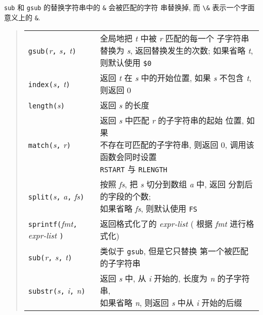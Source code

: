\texttt{sub} 和 \texttt{gsub} 的替换字符串中的 \verb'&' 会被匹配的字符
串替换掉, 而 \verb'\&' 表示一个字面意义上的 \verb'&'.
\begin{quote}
    \begin{tabular}{ll}
        \texttt{gsub(}\textit{r}\texttt{,} \textit{s}\texttt{,}
        \textit{t}\texttt{)} &
        \makecell[tl]{全局地把 \textit{t} 中被 \textit{r} 匹配的每一个
        子字符串替换为 \textit{s}, 返回替换发生的次数; \\ 如果省略 \textit{t},
        则默认使用 \texttt{\$0}} \\

        \texttt{index(}\textit{s}\texttt{,} \textit{t}\texttt{)} &
        返回 \textit{t} 在 \textit{s} 中的开始位置, 如果 \textit{s}
        不包含 \textit{t}, 则返回 0 \\

        \texttt{length(}\textit{s}\texttt{)} & 返回 \textit{s} 的长度 \\

        \texttt{match(}\textit{s}\texttt{,} \textit{r}\texttt{)} &
        \makecell[tl]{返回 \textit{s} 中匹配 \textit{r} 的子字符串的起始
        位置, 如果 \\ 不存在可匹配的子字符串, 则返回 0,
        调用该函数会同时设置 \\ \texttt{RSTART} 与 \texttt{RLENGTH}} \\

        \texttt{split(}\textit{s}\texttt{,} \textit{a}\texttt{,}
        \textit{fs}\texttt{)} & \makecell[tl]{按照 \textit{fs}, 把
        \textit{s} 切分到数组 \textit{a} 中, 返回 
        分割后的字段的个数;\\ 如果省略 \textit{fs}, 则默认使用
        \texttt{FS}} \\

        \texttt{sprintf(}\textit{fmt}\texttt{,} \textit{expr-list}
        \texttt{)} & 返回格式化了的 \textit{expr-list} (
        根据 \textit{fmt} 进行格式化) \\

        \texttt{sub(}\textit{r}\texttt{,} \textit{s}\texttt{,}
        \textit{t}\texttt{)}   & 类似于 \texttt{gsub}, 但是它只替换
        第一个被匹配的子字符串 \\

        \texttt{substr(}\textit{s}\texttt{,} \textit{i}\texttt{,}
        \textit{n}\texttt{)} & \makecell[tl]{返回 \textit{s} 中, 从
        \textit{i} 开始的, 长度为 \textit{n} 的子字符串, \\ 
        如果省略 \textit{n}, 则返回
        \textit{s} 中从 \textit{i} 开始的后缀} \\
    \end{tabular}
\end{quote}

